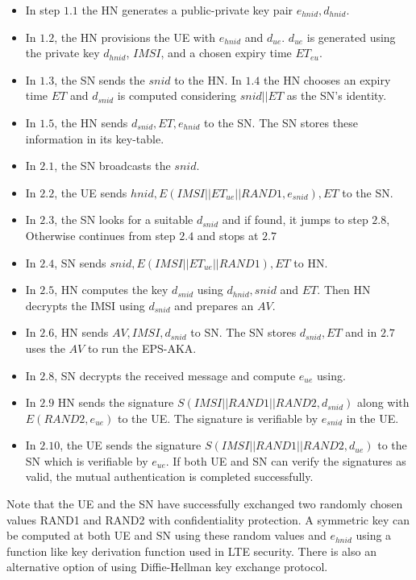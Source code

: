 \documentclass{river-journal}
\begin{document}
\begin{itemize}
\item In step $1.1$ the HN generates a public-private key pair $e_{hnid},d_{hnid}$.
\item In $1.2$, the HN provisions the UE with $e_{hnid}$ and $d_{ue}$. $d_{ue}$ is generated using the private key $d_{hnid}$, $IMSI$, and a chosen expiry time $ET_{eu}$. 
\item In  $1.3$, the SN sends the $snid$ to the HN. In  $1.4$ the HN chooses an expiry time $ET$ and $d_{snid}$ is computed considering $snid||ET$ as the SN's identity. 
\item In  $1.5$, the HN sends $d_{snid},ET,e_{hnid}$ to the SN. The SN stores these information in its key-table. 
\item In  $2.1$, the SN broadcasts the $snid$. 
\item In  $2.2$, the UE sends $hnid,E(IMSI||ET_{ue}||RAND1,e_{snid}),ET$ to the SN. 
\item In  $2.3$, the SN looks for a suitable $d_{snid}$ and if found, it jumps to step $2.8$, Otherwise continues from step $2.4$ and stops at $2.7$
\item In $2.4$, SN sends $snid,E(IMSI||ET_{ue}||RAND1),ET$ to HN. 
\item In $2.5$, HN computes the key $d_{snid}$ using $d_{hnid},snid$ and $ET$. Then HN decrypts the IMSI using $d_{snid}$ and  prepares an $AV$.
\item In $2.6$, HN sends  $AV,IMSI,d_{snid}$ to SN. The SN stores $d_{snid},ET$ and in $2.7$ uses the $AV$ to run the EPS-AKA.
\item In $2.8$, SN decrypts the received message and compute $e_{ue}$ using. 
\item In $2.9$ HN sends the signature $S(IMSI||RAND1||RAND2,d_{snid})$ along with $E(RAND2,e_{ue})$ to the UE. The signature is verifiable by $e_{snid}$ in the UE. 
\item In $2.10$, the UE sends the signature $S(IMSI||RAND1||RAND2,d_{ue})$ to the SN which is verifiable by $e_{ue}$. If both UE and SN can verify the signatures as valid, the mutual authentication is completed successfully.
\end{itemize}

Note that the UE and the SN have successfully exchanged two randomly chosen values RAND1 and RAND2 with confidentiality protection. A symmetric key can be computed at both UE and SN using these random values and $e_{hnid}$ using a function like key derivation function used in LTE security. There is also an alternative option of using Diffie-Hellman key exchange protocol. 
\end{document}
